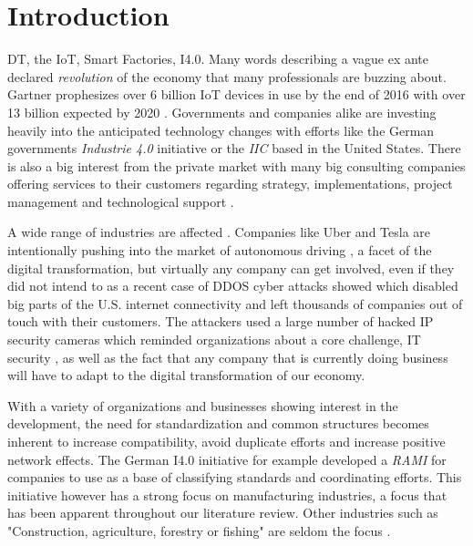 \section{Introduction}\label{Introduction}
\ac{DT}, the \ac{IoT}, Smart Factories,
\ac{I4.0}. Many words describing a vague ex ante declared
\emph{revolution} of the economy that many professionals are buzzing
about. Gartner prophesizes over 6 billion IoT devices in use by the end
of 2016 with over 13 billion expected by 2020
\cite{gartner-iot-number-devices}. Governments and companies alike are
investing heavily into the anticipated technology changes with efforts
like the German governments \emph{Industrie 4.0} \cite{i40-web} initiative %
or the \emph{\ac{IIC}} \cite{iic-web} based in the United States.
There is also a big interest from the private market with many big consulting companies offering services to their customers regarding strategy, implementations, project management and technological support
\cite{westerman2011digital,mckinsey-nine-questions,bcg-dt,accenture-dt:2015}.

A wide range of industries are affected \cite{westerman2011digital,iic-web}. Companies like Uber and Tesla are intentionally pushing into the market of autonomous driving \cite{uber-autonomous,tesla-autonomous-blog}, a facet of the digital transformation, but virtually any company can get involved, even if they did not intend to as a recent case of DDOS cyber attacks showed which disabled big parts of the U.S. internet connectivity and left thousands of companies out of touch with their customers. The attackers used a large number of hacked IP security cameras which reminded organizations about a core challenge, IT security \cite{forbes-ddos-cameras}, as well as the fact that any company that is currently doing business will have to adapt to the digital transformation of our economy.

With a variety of organizations and businesses showing interest in the development, the need for standardization and common structures becomes inherent to increase compatibility, avoid duplicate efforts and increase positive network effects. The German \ac{I4.0} initiative for example developed a \emph{\ac{RAMI}} for companies to use as a base of classifying standards and coordinating efforts. 
This initiative however has a strong focus on manufacturing industries, a focus that has been apparent throughout our literature review. Other industries such as "Construction, agriculture, forestry or fishing" are seldom the focus \cite{bauer2015industrie,barometer:2016}. 

